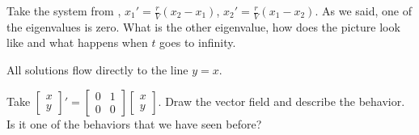 \begin{exercise}
Take the system from ,
$x_1'=\frac{r}{V}(x_2-x_1)$,
$x_2'=\frac{r}{V}(x_1-x_2)$.
As we said, one of the eigenvalues is zero.  What is the other eigenvalue, how
does the picture look like and what happens when $t$ goes to infinity.
\end{exercise}
\comboSol{%
}
{%
All solutions flow directly to the line $y=x$.
}

\begin{exercise}\ansMark%
Take
$\left[ \begin{smallmatrix}
x \\ y
\end{smallmatrix}\right] '
=
\left[ \begin{smallmatrix}
0 & 1 \\ 0 & 0
\end{smallmatrix}\right]
\left[ \begin{smallmatrix}
x \\ y
\end{smallmatrix}\right]$.
Draw the vector field and describe the behavior.  Is it one of the
behaviors that we have seen before?
\end{exercise}


